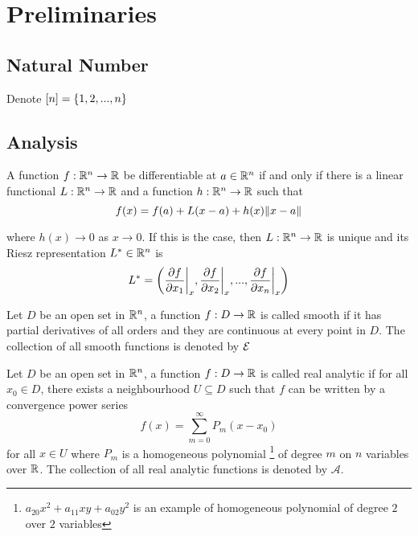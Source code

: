 \chapter{Preliminaries}

\section{Natural Number}


\begin{definition}
	Denote $[n] = \set{1, 2, ..., n}$
\end{definition}

\section{Analysis}

\begin{theorem}
	A function $f: \R^n \to \R$ be differentiable at $a \in \R^n$ if and only if there is a linear functional $L: \R^n \to \R$ and a function $h: \R^n \to \R$ such that
	$$
	f(x) = f(a) + L(x - a) + h(x) \norm{x-a}
	$$
	
	where $h(x) \to 0$ as $x \to 0$. If this is the case, then $L: \R^n \to \R$ is unique and its Riesz representation $L^* \in \R^n$ is 
	$$
	L^* = \tuple*{\frac{\partial f}{\partial x_1}\bigg\vert_{x}, \frac{\partial f}{\partial x_2}\bigg\vert_{x}, ..., \frac{\partial f}{\partial x_n}\bigg\vert_{x}}
	$$
\end{theorem}

\begin{definition}
	Let $D$ be an open set in $\R^n$, a function $f: D \to \R$ is called smooth if it has partial derivatives of all orders and they are continuous at every point in $D$. The collection of all smooth functions is denoted by $\E$
\end{definition}

\begin{definition}
	Let $D$ be an open set in $\R^n$, a function $f: D \to \R$ is called real analytic if for all $x_0 \in D$, there exists a neighbourhood $U \subseteq D$ such that $f$ can be written by a convergence power series
	$$
	f(x) = \sum_{m=0}^\infty P_m(x - x_0)
	$$
	for all $x \in U$ where $P_m$ is a homogeneous polynomial \footnote{$a_{20} x^2 + a_{11} xy + a_{02} y^2$ is an example of homogeneous polynomial of degree $2$ over $2$ variables} of degree $m$ on $n$ variables over $\R$. The collection of all real analytic functions is denoted by $\mathcal{A}$.
\end{definition}

